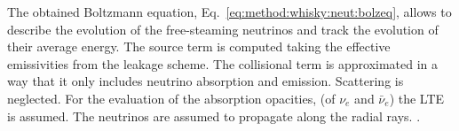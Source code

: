The obtained Boltzmann equation, Eq.~\eqref{eq:method:whisky:neut:bolzeq}, allows to describe
the evolution of the free-steaming neutrinos and track the evolution of their average energy.
%
The source term is computed taking the effective emissivities from the leakage scheme.
The collisional term is approximated in a way that it only includes neutrino absorption and emission. 
Scattering is neglected.
For the evaluation of the absorption opacities, (of $\nu_{e}$ and $\bar{\nu}_{e}$) the 
\ac{LTE} is assumed.
The neutrinos are assumed to propagate along the radial rays. 
\citep{Radice:2016dwd,Radice:2018pdn}.


